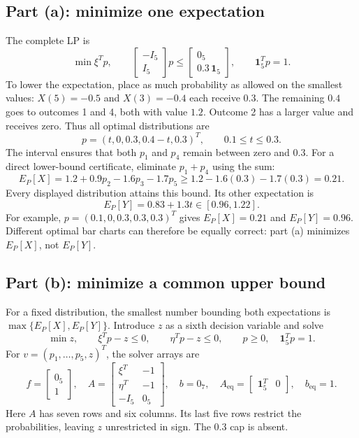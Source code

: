 \documentclass[11pt,a4paper]{article}
\begin{document}
\subsection{Part (a): minimize one expectation}
The complete LP is
\[
  \min\xi^Tp,\qquad
  \begin{bmatrix}-I_5\\I_5\end{bmatrix}p
  \leq\begin{bmatrix}0_5\\0.3\,\mathbf1_5\end{bmatrix},
  \qquad\mathbf1_5^Tp=1.
\]
To lower the expectation, place as much probability as allowed on the smallest
values: $X(5)=-0.5$ and $X(3)=-0.4$ each receive $0.3$.
The remaining $0.4$ goes to outcomes 1 and 4, both with value $1.2$.
Outcome 2 has a larger value and receives zero. Thus all optimal distributions are
\[
  p=(t,0,0.3,0.4-t,0.3)^T,\qquad 0.1\leq t\leq0.3.
\]
The interval ensures that both $p_1$ and $p_4$ remain between zero and $0.3$.
For a direct lower-bound certificate, eliminate $p_1+p_4$ using the sum:
\[
  E_P[X]=1.2+0.9p_2-1.6p_3-1.7p_5
  \geq1.2-1.6(0.3)-1.7(0.3)=0.21.
\]
Every displayed distribution attains this bound. Its other expectation is
\[
  E_P[Y]=0.83+1.3t\in[0.96,1.22].
\]
For example, $p=(0.1,0,0.3,0.3,0.3)^T$ gives
$E_P[X]=0.21$ and $E_P[Y]=0.96$. Different optimal bar charts can therefore
be equally correct: part (a) minimizes $E_P[X]$, not $E_P[Y]$.

\subsection{Part (b): minimize a common upper bound}
For a fixed distribution, the smallest number bounding both expectations is
$\max\{E_P[X],E_P[Y]\}$. Introduce $z$ as a sixth decision variable and solve
\[
  \min z,\qquad \xi^Tp-z\leq0,\qquad\eta^Tp-z\leq0,
  \qquad p\geq0,\quad\mathbf1_5^Tp=1.
\]
For $v=(p_1,\ldots,p_5,z)^T$, the solver arrays are
\[
  f=\begin{bmatrix}0_5\\1\end{bmatrix},\quad
  A=\begin{bmatrix}\xi^T&-1\\\eta^T&-1\\-I_5&0_5\end{bmatrix},\quad
  b=0_7,\quad A_{\mathrm{eq}}=\begin{bmatrix}\mathbf1_5^T&0\end{bmatrix},
  \quad b_{\mathrm{eq}}=1.
\]
Here $A$ has seven rows and six columns. Its last five rows restrict the
probabilities, leaving $z$ unrestricted in sign. The $0.3$ cap is absent.
\end{document}
